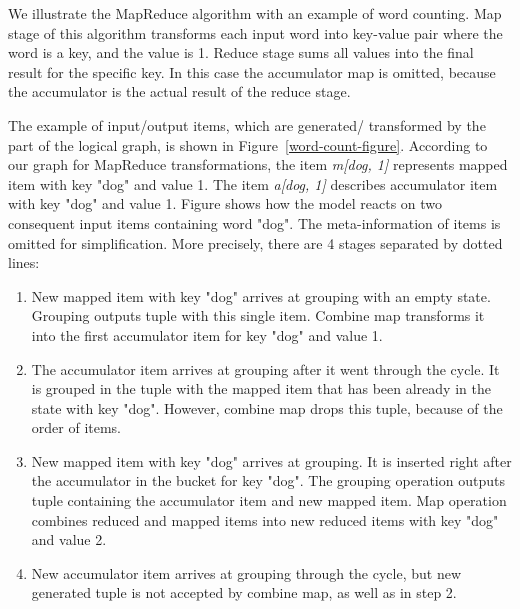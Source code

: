 We illustrate the MapReduce algorithm with an example of word counting. Map stage of this algorithm transforms each input word into key-value pair where the word is a key, and the value is 1. Reduce stage sums all values into the final result for the specific key. In this case the accumulator map is omitted, because the accumulator is the actual result of the reduce stage.

The example of input/output items, which are generated/ transformed by the part of the logical graph, is shown in Figure~\ref {word-count-figure}. According to our graph for MapReduce transformations, the item {\it m[dog, 1]} represents mapped item with key "dog" and value 1. The item {\it a[dog, 1]} describes accumulator item with key "dog" and value 1. Figure shows how the model reacts on two consequent input items containing word "dog". The meta-information of items is omitted for simplification. More precisely, there are 4 stages separated by dotted lines:

\begin{enumerate}
    \item New mapped item with key "dog" arrives at grouping with an empty state. Grouping outputs tuple with this single item. Combine map transforms it into the first accumulator item for key "dog" and value 1.
    \item The accumulator item arrives at grouping after it went through the cycle. It is grouped in the tuple with the mapped item that has been already in the state with key "dog". However, combine map drops this tuple, because of the order of items.
    \item New mapped item with key "dog" arrives at grouping. It is inserted right after the accumulator in the bucket for key "dog". The grouping operation outputs tuple containing the accumulator item and new mapped item. Map operation combines reduced and mapped items into new reduced items with key "dog" and value 2.
    \item New accumulator item arrives at grouping through the cycle, but new generated tuple is not accepted by combine map, as well as in step 2.
\end{enumerate}

